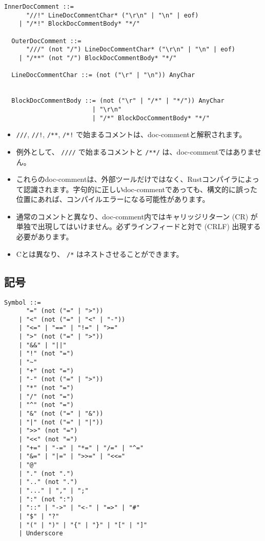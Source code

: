 \documentclass[dvipdfmx,uplatex,papersize,a4paper,10pt]{jsbook}
\theoremstyle{definition}
\begin{document}
\begin{lstlisting}[language=BNFLike, gobble=2]
  InnerDocComment ::=
      "//!" LineDocCommentChar* ("\r\n" | "\n" | eof)
    | "/*!" BlockDocCommentBody* "*/"

  OuterDocComment ::=
      "///" (not "/") LineDocCommentChar* ("\r\n" | "\n" | eof)
    | "/**" (not "/") BlockDocCommentBody* "*/"

  LineDocCommentChar ::= (not ("\r" | "\n")) AnyChar


  BlockDocCommentBody ::= (not ("\r" | "/*" | "*/")) AnyChar
                        | "\r\n"
                        | "/*" BlockDocCommentBody* "*/"
\end{lstlisting}

\begin{itemize}
  \item \verb|///|, \verb|//!|, \verb|/**|, \verb|/*!| で始まるコメントは、doc-commentと解釈されます。
  \item 例外として、 \verb|////| で始まるコメントと \verb|/**/| は、doc-commentではありません。
  \item これらのdoc-commentは、外部ツールだけではなく、Rustコンパイラによって認識されます。字句的に正しいdoc-commentであっても、構文的に誤った位置にあれば、コンパイルエラーになる可能性があります。
  \item 通常のコメントと異なり、doc-comment内ではキャリッジリターン (CR) が単独で出現してはいけません。必ずラインフィードと対で (CRLF) 出現する必要があります。
  \item Cとは異なり、 \verb|/*| はネストさせることができます。
\end{itemize}

\subsection{記号}

\begin{lstlisting}[language=BNFLike, gobble=2]
  Symbol ::=
      "=" (not ("=" | ">"))
    | "<" (not ("=" | "<" | "-"))
    | "<=" | "==" | "!=" | ">="
    | ">" (not ("=" | ">"))
    | "&&" | "||"
    | "!" (not "=")
    | "~"
    | "+" (not "=")
    | "-" (not ("=" | ">"))
    | "*" (not "=")
    | "/" (not "=")
    | "^" (not "=")
    | "&" (not ("=" | "&"))
    | "|" (not ("=" | "|"))
    | ">>" (not "=")
    | "<<" (not "=")
    | "+=" | "-=" | "*=" | "/=" | "^="
    | "&=" | "|=" | ">>=" | "<<="
    | "@"
    | "." (not ".")
    | ".." (not ".")
    | "..." | "," | ";"
    | ":" (not ":")
    | "::" | "->" | "<-" | "=>" | "#"
    | "$" | "?"
    | "(" | ")" | "{" | "}" | "[" | "]"
    | Underscore
\end{lstlisting}
\end{document}
